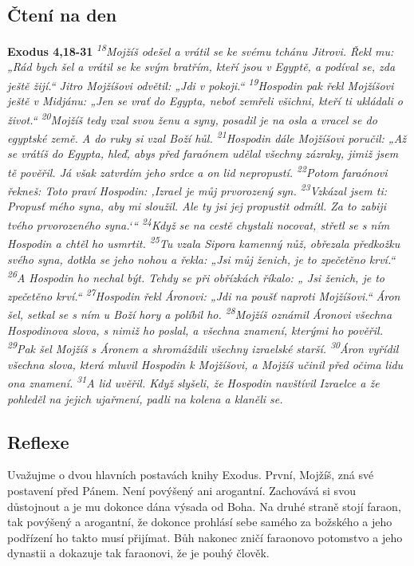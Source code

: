 \documentclass[11pt]{article}
\begin{document}
\subsection*{Čtení na den}
\textbf{Exodus 4,18-31}
\newline
\textit{
\textsuperscript{18}Mojžíš odešel a vrátil se ke svému tchánu Jitrovi. Řekl mu: „Rád bych šel a vrátil se ke svým bratřím, kteří jsou v Egyptě, a podíval se, zda ještě žijí.“ Jitro Mojžíšovi odvětil: „Jdi v pokoji.“
\textsuperscript{19}Hospodin pak řekl Mojžíšovi ještě v Midjánu: „Jen se vrať do Egypta, neboť zemřeli všichni, kteří ti ukládali o život.“
\textsuperscript{20}Mojžíš tedy vzal svou ženu a syny, posadil je na osla a vracel se do egyptské země. A do ruky si vzal Boží hůl.
\textsuperscript{21}Hospodin dále Mojžíšovi poručil: „Až se vrátíš do Egypta, hleď, abys před faraónem udělal všechny zázraky, jimiž jsem tě pověřil. Já však zatvrdím jeho srdce a on lid nepropustí.
\textsuperscript{22}Potom faraónovi řekneš: Toto praví Hospodin: ‚Izrael je můj prvorozený syn.
\textsuperscript{23}Vzkázal jsem ti: Propusť mého syna, aby mi sloužil. Ale ty jsi jej propustit odmítl. Za to zabiji tvého prvorozeného syna.‘“
\textsuperscript{24}Když se na cestě chystali nocovat, střetl se s ním Hospodin a chtěl ho usmrtit.
\textsuperscript{25}Tu vzala Sipora kamenný nůž, obřezala předkožku svého syna, dotkla se jeho nohou a řekla: „Jsi můj ženich, je to zpečetěno krví.“
\textsuperscript{26}A Hospodin ho nechal být. Tehdy se při obřízkách říkalo: „ Jsi ženich, je to zpečetěno krví.“
\textsuperscript{27}Hospodin řekl Áronovi: „Jdi na poušť naproti Mojžíšovi.“ Áron šel, setkal se s ním u Boží hory a políbil ho.
\textsuperscript{28}Mojžíš oznámil Áronovi všechna Hospodinova slova, s nimiž ho poslal, a všechna znamení, kterými ho pověřil.
\textsuperscript{29}Pak šel Mojžíš s Áronem a shromáždili všechny izraelské starší.
\textsuperscript{30}Áron vyřídil všechna slova, která mluvil Hospodin k Mojžíšovi, a Mojžíš učinil před očima lidu ona znamení.
\textsuperscript{31}A lid uvěřil. Když slyšeli, že Hospodin navštívil Izraelce a že pohleděl na jejich ujařmení, padli na kolena a klaněli se.
}

\subsection*{Reflexe}

Uvažujme o dvou hlavních postavách knihy Exodus. První, Mojžíš, zná své postavení před Pánem. Není povýšený
ani arogantní. Zachovává si svou důstojnout a je mu dokonce dána výsada od Boha. Na druhé straně stojí faraon, tak
povýšený a arogantní, že dokonce prohlásí sebe samého za božského a jeho podřízení ho takto musí přijímat. Bůh
nakonec zničí faraonovo potomstvo a jeho dynastii a dokazuje tak faraonovi, že je pouhý člověk.
\end{document}

